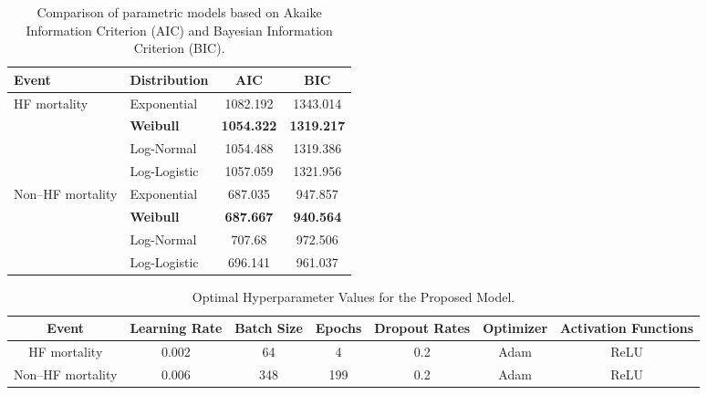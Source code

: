\documentclass[twoside]{article}
\begin{document}
\begin{table}[h]
\begin{center}
\small
\caption{Comparison of parametric models based on Akaike Information Criterion (AIC) and Bayesian Information Criterion (BIC).}\label{tab2}
\begin{tabular}{|l|l|c|c|}
  \hline
  \textbf{Event} & \textbf{Distribution} & \textbf{AIC} & \textbf{BIC} \\ \hline \hline
  HF mortality & Exponential   & 1082.192 & 1343.014 \\
               & \textbf{Weibull}       & \textbf{1054.322} & \textbf{1319.217} \\
               & Log-Normal    & 1054.488 & 1319.386 \\
               & Log-Logistic  & 1057.059 & 1321.956 \\ \hline
  Non--HF mortality & Exponential   & 687.035  & 947.857 \\
                    & \textbf{Weibull}       & \textbf{687.667}  & \textbf{940.564} \\
                    & Log-Normal    & 707.68   & 972.506 \\
                    & Log-Logistic  & 696.141  & 961.037 \\ \hline
\end{tabular}
\end{center}
\end{table}

\begin{table}[h]
\begin{center}
\small
\caption{Optimal Hyperparameter Values for the Proposed Model.}\label{tab3}
\begin{tabular}{|c|c|c|c|c|c|c|}
  \hline
\textbf{Event} & \textbf{Learning Rate} & \textbf{Batch Size} & \textbf{Epochs} & \textbf{Dropout Rates} & \textbf{Optimizer} & \textbf{Activation Functions} \\ \hline \hline
HF mortality & 0.002 & 64 & 4 & 0.2 & Adam & ReLU \\
Non--HF mortality & 0.006 & 348 & 199 & 0.2 & Adam & ReLU \\ \hline
\end{tabular}
\end{center}
\end{table}
\end{document}

